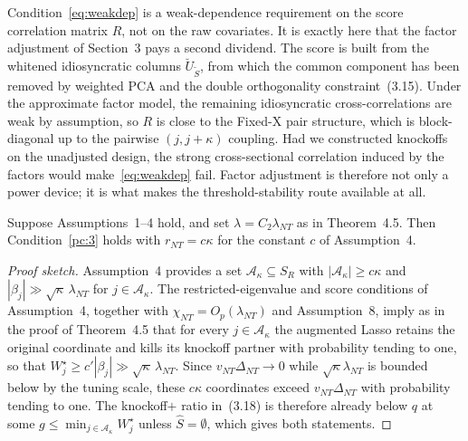 \begin{remark}
\label{rmk:pca-buys-weakdep}
Condition~\eqref{eq:weakdep} is a weak-dependence requirement on the score
correlation matrix $R$, not on the raw covariates.  It is exactly here that the
factor adjustment of Section~3 pays a second dividend.  The score is built from
the whitened idiosyncratic columns $\breve U_{\widetilde S}$, from which the
common component has been removed by weighted PCA and the double orthogonality
constraint~(3.15).  Under the approximate factor model, the remaining
idiosyncratic cross-correlations are weak by assumption, so $R$ is close to the
Fixed-X pair structure, which is block-diagonal up to the pairwise
$(j, j+\kappa)$ coupling.  Had we constructed knockoffs on the unadjusted
design, the strong cross-sectional correlation induced by the factors would
make~\eqref{eq:weakdep} fail.  Factor adjustment is therefore not only a power
device; it is what makes the threshold-stability route available at all.
\end{remark}

\begin{lemma}
\label{lem:pc3}
Suppose Assumptions~1--4 hold, and set $\lambda = C_2 \lambda_{NT}$ as in
Theorem~4.5.  Then Condition~\ref{pc:3} holds with
$r_{NT} = c\kappa$ for the constant $c$ of Assumption~4.
\end{lemma}

\begin{proof}[Proof sketch]
Assumption~4 provides a set $\mathcal{A}_\kappa \subseteq S_R$ with
$|\mathcal{A}_\kappa| \ge c\kappa$ and $|\beta_j| \gg \sqrt{\kappa}\,\lambda_{NT}$
for $j \in \mathcal{A}_\kappa$.  The restricted-eigenvalue and score conditions
of Assumption~4, together with $\chi_{NT} = O_p(\lambda_{NT})$ and
Assumption~8, imply as in the proof of Theorem~4.5 that for every
$j \in \mathcal{A}_\kappa$ the augmented Lasso retains the original coordinate
and kills its knockoff partner with probability tending to one, so that
$W_j^\star \ge c'|\beta_j| \gg \sqrt{\kappa}\,\lambda_{NT}$.  Since
$v_{NT}\Delta_{NT} \to 0$ while $\sqrt{\kappa}\lambda_{NT}$ is bounded below by
the tuning scale, these $c\kappa$ coordinates exceed $v_{NT}\Delta_{NT}$ with
probability tending to one.  The knockoff$+$ ratio in~(3.18) is therefore
already below $q$ at some $g \le \min_{j \in \mathcal{A}_\kappa} W_j^\star$
unless $\widehat S = \emptyset$, which gives both statements.
\end{proof}

